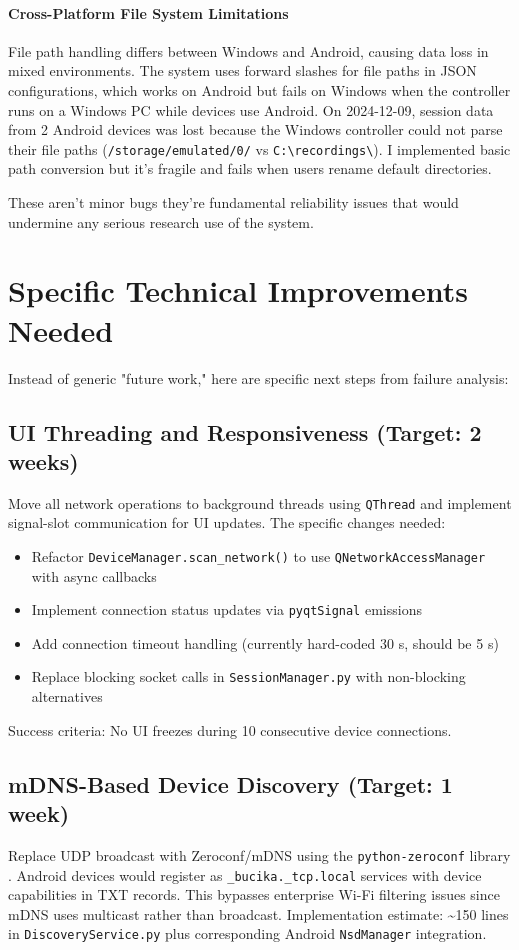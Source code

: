 \paragraph{\textbf{Cross-Platform File System Limitations}} File path handling differs between Windows and Android, causing data loss in mixed environments. The system uses forward slashes for file paths in JSON configurations, which works on Android but fails on Windows when the controller runs on a Windows PC while devices use Android. On 2024-12-09, session data from 2 Android devices was lost because the Windows controller could not parse their file paths (\verb|/storage/emulated/0/| vs \verb|C:\recordings\|). I implemented basic path conversion but it's fragile and fails when users rename default directories.

These aren't minor bugs \textemdash they're fundamental reliability issues that would undermine any serious research
use of the system.

\section{Specific Technical Improvements Needed}

Instead of generic "future work," here are specific next steps from failure analysis:

\subsection{UI Threading and Responsiveness (Target: 2 weeks)}
Move all network operations to background threads using \texttt{QThread} and implement signal-slot communication for UI updates. The specific changes needed:
\begin{itemize}
    \item Refactor \texttt{DeviceManager.scan\_network()} to use \texttt{QNetworkAccessManager} with async callbacks
    \item Implement connection status updates via \texttt{pyqtSignal} emissions
    \item Add connection timeout handling (currently hard-coded 30 s, should be 5 s)
    \item Replace blocking socket calls in \texttt{SessionManager.py} with non-blocking alternatives
\end{itemize}
Success criteria: No UI freezes during 10 consecutive device connections.

\subsection{mDNS-Based Device Discovery (Target: 1 week)}
Replace UDP broadcast with Zeroconf/mDNS using the \texttt{python-zeroconf} library \cite{ref19}. Android devices would register as \texttt{\_bucika.\_tcp.local} services with device capabilities in TXT records. This bypasses enterprise Wi-Fi filtering issues since mDNS uses multicast rather than broadcast. Implementation estimate: \textasciitilde{}150 lines in \texttt{DiscoveryService.py} plus corresponding Android \texttt{NsdManager} integration.

